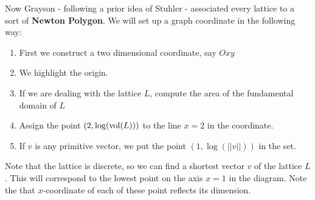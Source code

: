 \vspace{\baselineskip}
Now Grayson - following a prior idea of Stuhler - associated every lattice to a sort of \textbf{Newton Polygon}.
We will set up a graph coordinate in the following way:
\begin{enumerate}
  \item First we construct a two dimensional coordinate, say $Oxy$
  \item We highlight the origin.
  \item If we are dealing with the lattice $L$, compute the area of the fundamental domain of $L$
  \item Assign the point $(2, \log(\operatorname{vol}(L)))$ to the line $x=2$ in the coordinate.
  \item If $v$ is any primitive vector, we put the point $(1,\log(||v||))$ in the set.
\end{enumerate}
Note that the lattice is discrete, so we can find a shortest vector $v$ of the lattice $L$. This will
correspond to the lowest point on the axis $x=1$ in the diagram. Note the that $x$-coordinate
of each of these point reflects its dimension.


